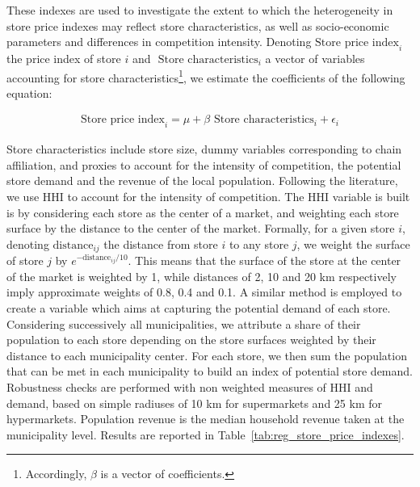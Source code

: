 \documentclass[english]{article}
\begin{document}
These indexes are used to investigate the extent to which the heterogeneity in store price indexes may reflect store characteristics, as well as socio-economic parameters and differences in competition intensity. Denoting $\text{Store price index}_{i}$ the price index of store $i$ and $\text{ Store characteristics}_i$ a vector of variables accounting for store characteristics\footnote{Accordingly, $\beta$ is a vector of coefficients.}, we estimate the coefficients of the following equation:

\begin{align}
\text{Store price index}_{i} = \mu + \beta \text{ Store characteristics}_i + \epsilon_{i}
\label{reg_store_indexes}
\end{align}

Store characteristics include store size, dummy variables corresponding to chain affiliation, and proxies to account for the intensity of competition, the potential store demand and the revenue of the local population. Following the literature, we use HHI to account for the intensity of competition. The HHI variable is built is by considering each store as the center of a market, and weighting each store surface by the distance to the center of the market. Formally, for a given store $i$, denoting $\text{distance}_{ij}$ the distance from store $i$ to any store $j$, we weight the surface of store $j$ by $e^{-\text{distance}_{ij}/10}$. This means that the surface of the store at the center of the market is weighted by 1, while distances of 2, 10 and 20 km respectively imply approximate weights of 0.8, 0.4 and 0.1. A similar method is employed to create a variable which aims at capturing the potential demand of each store. Considering successively all municipalities, we attribute a share of their population to each store depending on the store surfaces weighted by their distance to each municipality center. For each store, we then sum the population that can be met in each municipality to build an index of potential store demand. Robustness checks are performed with non weighted measures of HHI and demand, based on simple radiuses of 10 km for supermarkets and 25 km for hypermarkets. Population revenue is the median household revenue taken at the municipality level. Results are reported in Table~\ref{tab:reg_store_price_indexes}.
\end{document}
